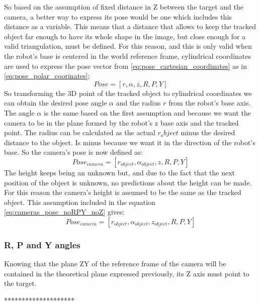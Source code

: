 	So based on the assumption of fixed distance in Z between the target and the camera, a better way to express its pose would be one which includes this distance as a variable.  
	This means that a distance that allows to keep the tracked object far enough to have its whole shape in the image, but close enough for a valid triangulation, must be defined.
	For this reason, and this is only valid when the robot's base is centered in the world reference frame, cylindrical coordinates are used to express the pose vector from \ref{eq:pose_cartesian_coordinates} as in \ref{eq:pose_polar_coorinates};
		\begin{equation}
		\label{eq:pose_polar_coorinates}
			Pose = [r,\alpha,z,R,P,Y]
		\end{equation}
	So transforming the 3D point of the tracked object to cylindrical coordinates we can obtain the desired pose angle $\alpha$ and the radius $r$ from the robot's base axis. 
	The angle $\alpha$ is the same based on the first assumption and because we want the camera to be in the plane formed by the robot's z base axis and the tracked point. 
	The radius can be calculated as the actual $r_object$ minus the desired distance to the object. Is minus because we want it in the direction of the robot's base. 
	So the camera's pose is now defined as:
		\begin{equation}
		\label{eq:cameras_pose_noRPY_noZ}
			Pose_{camera} = [r_{object},\alpha_{object},z,R,P,Y]
		\end{equation}
	The height keeps being an unknown but, and due to the fact that the next position of the object is unknown, no predictions about the height can be made. 
	For this reason the camera's height is assumed to be the same as the tracked object. This assumption included in the equation \ref{eq:cameras_pose_noRPY_noZ} gives:
		\begin{equation}
			\label{eq:cameras_pose_noRPY}
			Pose_{camera} = [r_{object},\alpha_{object},z_{object},R,P,Y]
		\end{equation}
	\subsubsection{R, P and Y angles} %
	\label{subsub:r_p_and_y_angles}
	Knowing that the plane ZY of the reference frame of the camera will be contained in the theoretical plane expressed previously, its Z axis must point to the target.

	******************** 

